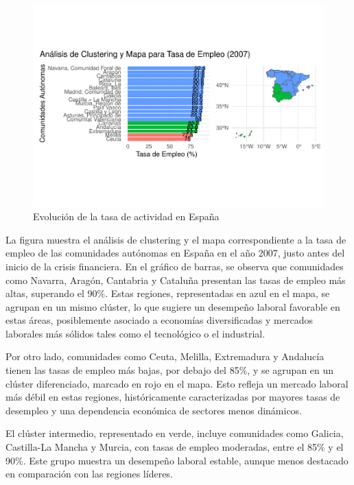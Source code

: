 \documentclass[Universitat de
València,article,submit,moreauthors,pdftex]{Definitions/mdpi}
\begin{document}
\begin{figure}[h]

{\centering \includegraphics[width=1\linewidth]{ProyectoAED2024_files/figure-latex/unnamed-chunk-35-1} 

}

\caption{Evolución de la tasa de actividad en España}\label{fig:unnamed-chunk-35}
\end{figure}

La figura muestra el análisis de clustering y el mapa correspondiente a
la tasa de empleo de las comunidades autónomas en España en el año 2007,
justo antes del inicio de la crisis financiera. En el gráfico de barras,
se observa que comunidades como Navarra, Aragón, Cantabria y Cataluña
presentan las tasas de empleo más altas, superando el 90\%. Estas
regiones, representadas en azul en el mapa, se agrupan en un mismo
clúster, lo que sugiere un desempeño laboral favorable en estas áreas,
posiblemente asociado a economías diversificadas y mercados laborales
más sólidos tales como el tecnológico o el industrial.

Por otro lado, comunidades como Ceuta, Melilla, Extremadura y Andalucía
tienen las tasas de empleo más bajas, por debajo del 85\%, y se agrupan
en un clúster diferenciado, marcado en rojo en el mapa. Esto refleja un
mercado laboral más débil en estas regiones, históricamente
caracterizadas por mayores tasas de desempleo y una dependencia
económica de sectores menos dinámicos.

El clúster intermedio, representado en verde, incluye comunidades como
Galicia, Castilla-La Mancha y Murcia, con tasas de empleo moderadas,
entre el 85\% y el 90\%. Este grupo muestra un desempeño laboral
estable, aunque menos destacado en comparación con las regiones líderes.
\end{document}
